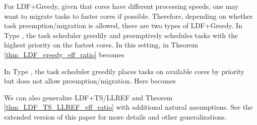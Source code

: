 \documentclass[prodmode,acmtompecs]{acmsmall}
\newcommand{\myComments}[1]{}
\newif\iftompecs
\newcommand{\tompecsStart}{\iftompecs \myComments{TOMPECS version: }}
\newcommand{\commentEnd}{\myComments{End}}
\begin{document}
For LDF+Greedy, given that cores have different processing speeds, one may want to migrate tasks to faster cores if possible. Therefore, 
depending on whether task preemption/migration is allowed, there are two types of LDF+Greedy. In Type , the task scheduler greedily and preemptively schedules tasks with the highest priority on the fastest cores. In this setting,  in Theorem \ref{thm_LDF_greedy_eff_ratio} becomes

In Type , the task scheduler greedily places tasks on available cores by priority but does not allow preemption/migration. Here  becomes


We can also generalize LDF+TS/LLREF and Theorem \ref{thm_LDF_TS_LLREF_eff_ratio} with additional natural assumptions. See the extended version of this paper \cite{EXT} for more details and other generalizations.
\commentEnd\fi


\tompecsStart
\end{document}
